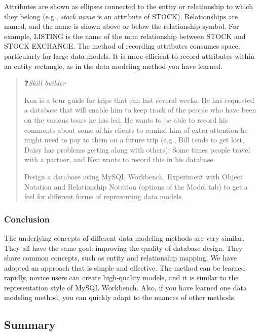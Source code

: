 \documentclass[
]{article}
\begin{document}
Attributes are shown as ellipses connected to the entity or relationship
to which they belong (e.g., \emph{stock name} is an attribute of STOCK).
Relationships are named, and the name is shown above or below the
relationship symbol. For example, LISTING is the name of the m:m
relationship between STOCK and STOCK EXCHANGE. The method of recording
attributes consumes space, particularly for large data models. It is
more efficient to record attributes within an entity rectangle, as in
the data modeling method you have learned.

\begin{quote}
❓\emph{Skill builder}

Ken is a tour guide for trips that can last several weeks. He has
requested a database that will enable him to keep track of the people
who have been on the various tours he has led. He wants to be able to
record his comments about some of his clients to remind him of extra
attention he might need to pay to them on a future trip (e.g., Bill
tends to get lost, Daisy has problems getting along with others). Some
times people travel with a partner, and Ken wants to record this in
his database.

Design a database using MySQL Workbench. Experiment with Object
Notation and Relationship Notation (options of the Model tab) to get a
feel for different forms of representing data models.
\end{quote}

\hypertarget{conclusion-1}{%
\subsubsection*{Conclusion}\label{conclusion-1}}

The underlying concepts of different data modeling methods are very
similar. They all have the same goal: improving the quality of database
design. They share common concepts, such as entity and relationship
mapping. We have adopted an approach that is simple and effective. The
method can be learned rapidly, novice users can create high-quality
models, and it is similar to the representation style of MySQL
Workbench. Also, if you have learned one data modeling method, you can
quickly adapt to the nuances of other methods.

\hypertarget{summary-8}{%
\subsection*{Summary}\label{summary-8}}
\end{document}
